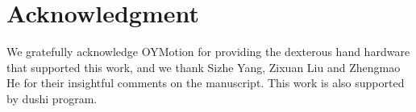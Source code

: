 \section{Acknowledgment}
We gratefully acknowledge OYMotion for providing the dexterous hand hardware that supported this work, and we thank Sizhe Yang, Zixuan Liu and Zhengmao He for their insightful comments on the manuscript. This work is also supported by dushi program. 